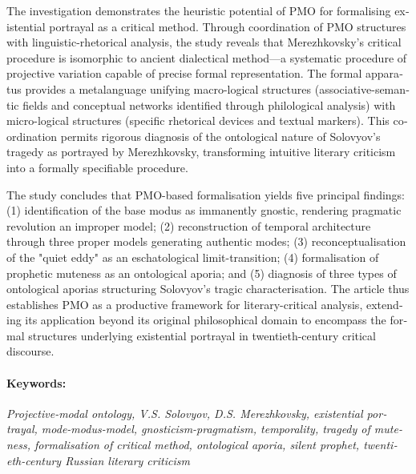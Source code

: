 \begin{english}
    The investigation demonstrates the heuristic potential of PMO for formalising existential portrayal as a critical method. Through coordination of PMO structures with linguistic-rhetorical analysis, the study reveals that Merezhkovsky's critical procedure is isomorphic to ancient dialectical method—a systematic procedure of projective variation capable of precise formal representation. The formal apparatus provides a metalanguage unifying macro-logical structures (associative-semantic fields and conceptual networks identified through philological analysis) with micro-logical structures (specific rhetorical devices and textual markers). This coordination permits rigorous diagnosis of the ontological nature of Solovyov's tragedy as portrayed by Merezhkovsky, transforming intuitive literary criticism into a formally specifiable procedure.

    The study concludes that PMO-based formalisation yields five principal findings: (1) identification of the base modus as immanently gnostic, rendering pragmatic revolution an improper model; (2) reconstruction of temporal architecture through three proper models generating authentic modes; (3) reconceptualisation of the "quiet eddy" as an eschatological limit-transition; (4) formalisation of prophetic muteness as an ontological aporia; and (5) diagnosis of three types of ontological aporias structuring Solovyov's tragic characterisation. The article thus establishes PMO as a productive framework for literary-critical analysis, extending its application beyond its original philosophical domain to encompass the formal structures underlying existential portrayal in twentieth-century critical discourse.

    \paragraph{Keywords:} {\itshape Projective-modal ontology, V.S. Solovyov, D.S. Merezhkovsky, existential portrayal, mode-modus-model, gnosticism-pragmatism, temporality, tragedy of muteness, formalisation of critical method, ontological aporia, silent prophet, twentieth-century Russian literary criticism}
    \end{english}
\else

